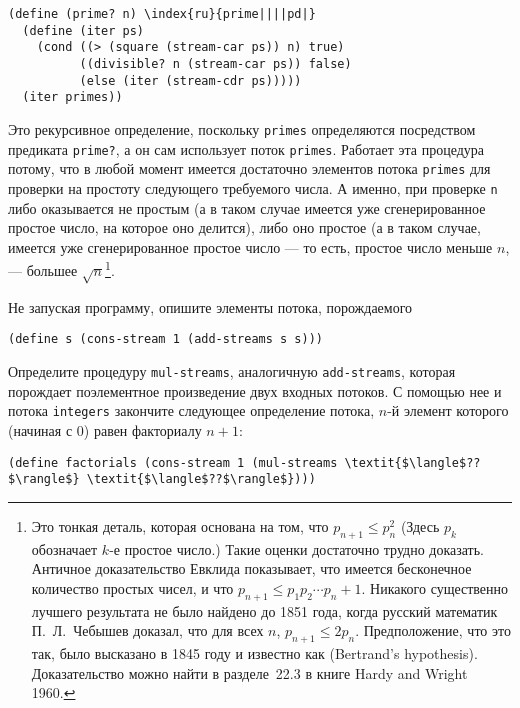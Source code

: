 \begin{Verbatim}[fontsize=\small]
(define (prime? n) \index{ru}{prime||||pd|}
  (define (iter ps)
    (cond ((> (square (stream-car ps)) n) true)
          ((divisible? n (stream-car ps)) false)
          (else (iter (stream-cdr ps)))))
  (iter primes))
\end{Verbatim}
Это рекурсивное определение, поскольку {\tt primes}
определяются посредством предиката {\tt prime?}, а он сам
использует поток {\tt primes}.  Работает эта процедура
потому, что в любой момент имеется
достаточно элементов потока {\tt primes} для проверки на
простоту следующего требуемого числа.  А именно, при
проверке {\tt n} либо оказывается не простым (а в
таком случае имеется уже сгенерированное простое число, на которое
оно делится), либо оно простое (а в таком случае, имеется
уже сгенерированное простое число --- то есть, простое число меньше
$n$, --- большее $\sqrt{n}$\footnote{Это тонкая деталь, которая основана на том, что
$p_{n+1} \le p_{n}^2$ (Здесь $p_k$ обозначает
$k$-е простое число.)  Такие оценки достаточно трудно
доказать.  Античное доказательство Евклида показывает, что
имеется бесконечное количество простых чисел, и что
$p_{n+1} \le p_1 p_2 \cdots p_n + 1$. Никакого
существенно лучшего результата не было найдено до 1851 года, когда
русский математик
П.~Л.~Чебышев
доказал, что для всех $n$,
$p_{n+1} \le 2p_n$.  Предположение, что это так, было
высказано в 1845 году и известно как  (Bertrand's hypothesis).
Доказательство можно найти в разделе~22.3 в книге
Hardy and Wright 1960.
}.
\begin{exercise}{3.53}\label{EX3.53}%
Не запуская программу, опишите элементы потока,
порождаемого

\begin{Verbatim}[fontsize=\small]
(define s (cons-stream 1 (add-streams s s)))
\end{Verbatim}
\end{exercise}
\begin{exercise}{3.54}\label{EX3.54}%
Определите процедуру {\tt mul-streams},
аналогичную {\tt add-streams}, которая порождает поэлементное
произведение двух входных потоков.  С помощью нее и потока
{\tt integers} закончите следующее определение потока,
$n$-й элемент которого (начиная с 0) равен факториалу
$n+1$:

\begin{Verbatim}[fontsize=\small]
(define factorials (cons-stream 1 (mul-streams \textit{$\langle$??$\rangle$} \textit{$\langle$??$\rangle$})))
\end{Verbatim}
\end{exercise}
